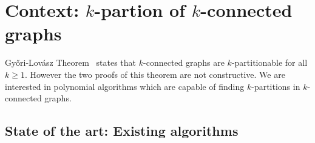 \section{Context: $k$-partion of $k$-connected graphs}
Gy{\H o}ri-Lovász Theorem~\cite{GE78,LL77} states that $k$-connected graphs are 
$k$-partitionable for all $k \geq 1$. However the two proofs of this theorem
are not constructive. We are interested in polynomial algorithms which
are capable of finding $k$-partitions in $k$-connected graphs.



\subsection{State of the art: Existing algorithms}

